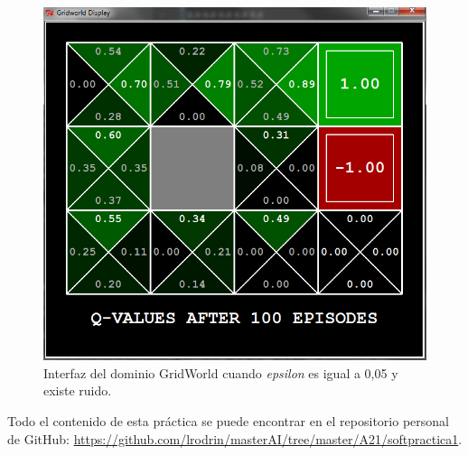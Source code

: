 \documentclass[11pt]{exam}
\begin{document}
\begin{questions}
\begin{figure}[h]
	\centering
	\includegraphics[scale=0.5]{image_5}
	\caption{Interfaz del dominio GridWorld cuando \textit{epsilon} es igual a 0,05 y existe ruido.}
	\label{image_5}
\end{figure}

\end{questions}

Todo el contenido de esta práctica se puede encontrar en el repositorio personal de GitHub: \url{https://github.com/lrodrin/masterAI/tree/master/A21/softpractica1}.
\end{document}
